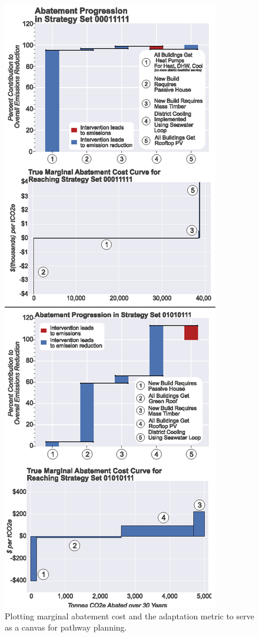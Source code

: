 \documentclass[twocolumn, a4paper,10pt]{article}
\begin{document}
\begin{figure}[hbpt]
    \centering
    \captionsetup{margin=.5cm}
    \includegraphics[scale=0.95]{figures/true_maccs_waterfalls_both.eps}
    \caption{Plotting marginal abatement cost and the adaptation metric to serve as a canvas for pathway planning.}
    \label{fig:true_macc_both}
\end{figure}
\end{document}
